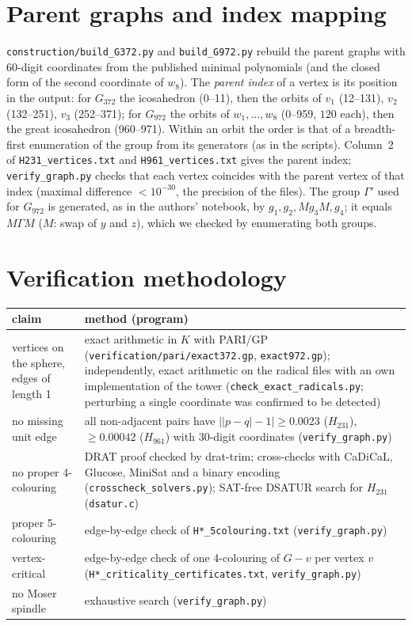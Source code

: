 \documentclass[10pt]{article}
\begin{document}
\section{Parent graphs and index mapping}
\texttt{construction/build\_G372.py} and \texttt{build\_G972.py} rebuild the parent graphs with $60$-digit
coordinates from the published minimal polynomials (and the closed form of the second coordinate of $w_8$).
The \emph{parent index} of a vertex is its position in the output: for $G_{372}$ the icosahedron (0--11),
then the orbits of $v_1$ (12--131), $v_2$ (132--251), $v_3$ (252--371); for $G_{972}$ the orbits of
$w_1,\dots,w_8$ (0--959, $120$ each), then the great icosahedron (960--971). Within an orbit the order is
that of a breadth-first enumeration of the group from its generators (as in the scripts). Column~2 of
\texttt{H231\_vertices.txt} and \texttt{H961\_vertices.txt} gives the parent index;
\texttt{verify\_graph.py} checks that each vertex coincides with the parent vertex of that index
(maximal difference $<10^{-30}$, the precision of the files). The group $\Gamma'$ used for $G_{972}$ is
generated, as in the authors' notebook, by $g_1,g_2,Mg_3M,g_4$; it equals $M\Gamma M$ ($M$: swap of $y$
and $z$), which we checked by enumerating both groups.

\section{Verification methodology}
\begin{center}\small
\begin{tabular}{p{}p{}}
\toprule
claim & method (program)\\
\midrule
vertices on the sphere, edges of length 1 & exact arithmetic in $K$ with PARI/GP (\texttt{verification/pari/exact372.gp}, \texttt{exact972.gp}); independently, exact arithmetic on the radical files with an own implementation of the tower (\texttt{check\_exact\_radicals.py}; perturbing a single coordinate was confirmed to be detected)\\
no missing unit edge & all non-adjacent pairs have $\bigl||p-q|-1\bigr|\ge 0.0023$ ($H_{231}$), $\ge 0.00042$ ($H_{961}$) with 30-digit coordinates (\texttt{verify\_graph.py})\\
no proper 4-colouring & DRAT proof checked by drat-trim; cross-checks with CaDiCaL, Glucose, MiniSat and a binary encoding (\texttt{crosscheck\_solvers.py}); SAT-free DSATUR search for $H_{231}$ (\texttt{dsatur.c})\\
proper 5-colouring & edge-by-edge check of \texttt{H*\_5colouring.txt} (\texttt{verify\_graph.py})\\
vertex-critical & edge-by-edge check of one 4-colouring of $G-v$ per vertex $v$ (\texttt{H*\_criticality\_certificates.txt}, \texttt{verify\_graph.py})\\
no Moser spindle & exhaustive search (\texttt{verify\_graph.py})\\
\bottomrule
\end{tabular}
\end{center}
\end{document}
